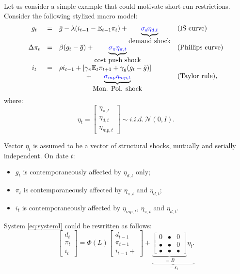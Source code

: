 \documentclass[
  12pt,
]{book}
\providecommand{\tightlist}{%
  \setlength{\itemsep}{0pt}\setlength{\parskip}{0pt}}
\theoremstyle{definition}
\theoremstyle{definition}
\theoremstyle{definition}
\theoremstyle{definition}
\theoremstyle{remark}
\begin{document}
Let us consider a simple example that could motivate short-run restrictions. Consider the following stylized macro model:
\begin{equation}
\begin{array}{clll}
g_{t}&=& \bar{g}-\lambda(i_{t-1}-\mathbb{E}_{t-1}\pi_{t})+ \underbrace{{\color{blue}\sigma_d \eta_{d,t}}}_{\mbox{demand shock}}& (\mbox{IS curve})\\
\Delta \pi_{t} & = & \beta (g_{t} - \bar{g})+ \underbrace{{\color{blue}\sigma_{\pi} \eta_{\pi,t}}}_{\mbox{cost push shock}} & (\mbox{Phillips curve})\\
i_{t} & = & \rho i_{t-1} + \left[ \gamma_\pi \mathbb{E}_{t}\pi_{t+1}  + \gamma_g (g_{t} - \bar{g}) \right]\\
&& \qquad \qquad+\underbrace{{\color{blue}\sigma_{mp} \eta_{mp,t}}}_{\mbox{Mon. Pol. shock}} & (\mbox{Taylor rule}),
\end{array}\label{eq:systemI}
\end{equation}
where:
\begin{equation}
\eta_t = 
\left[
\begin{array}{c}
\eta_{\pi,t}\\
\eta_{d,t}\\
\eta_{mp,t}
\end{array}
\right]
\sim i.i.d.\,\mathcal{N}(0,I).\label{eq:covU}
\end{equation}

Vector \(\eta_t\) is assumed to be a vector of structural shocks, mutually and serially independent. On date \(t\):

\begin{itemize}
\tightlist
\item
  \(g_t\) is contemporaneously affected by \(\eta_{d,t}\) only;
\item
  \(\pi_t\) is contemporaneously affected by \(\eta_{\pi,t}\) and \(\eta_{d,t}\);
\item
  \(i_t\) is contemporaneously affected by \(\eta_{mp,t}\), \(\eta_{\pi,t}\) and \(\eta_{d,t}\).
\end{itemize}

System \eqref{eq:systemI} could be rewritten as follows:
\begin{equation}
\left[\begin{array}{c}
d_t\\
\pi_t\\
i_t
\end{array}\right]
= \Phi(L)
\left[\begin{array}{c}
d_{t-1}\\
\pi_{t-1}\\
i_{t-1} +
\end{array}\right] +\underbrace{\underbrace{
\left[
\begin{array}{ccc}
0 & \bullet & 0 \\
\bullet & \bullet & 0 \\
\bullet & \bullet & \bullet
\end{array}
\right]}_{=B} \eta_t.}_{=\varepsilon_t}\label{eq:BBBB}
\end{equation}
\end{document}
